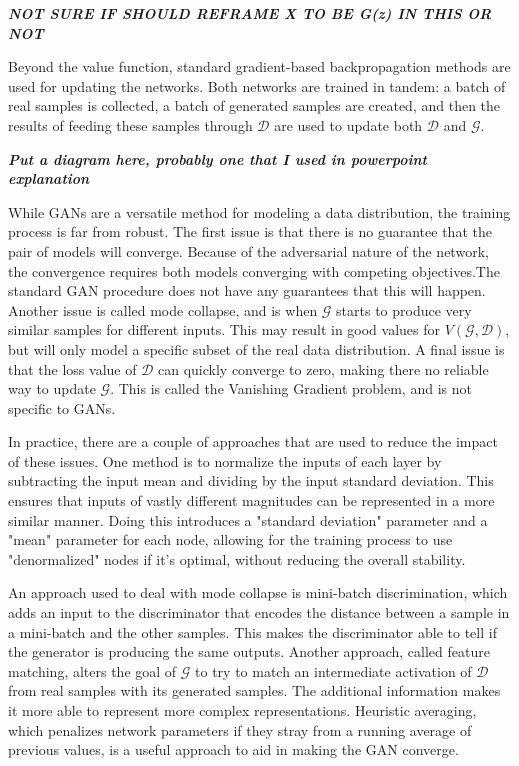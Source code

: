 	\textit{\textbf{NOT SURE IF SHOULD REFRAME X TO BE G(z) IN THIS OR NOT}}
	\par Beyond the value function, standard gradient-based backpropagation methods are used for updating the networks. Both networks are trained in tandem: a batch of real samples is collected, a batch of generated samples are created, and then the results of feeding these samples through $\mathcal{D}$ are used to update both $\mathcal{D}$ and $\mathcal{G}$.  
	\par \textit{\textbf{Put a diagram here, probably one that I used in powerpoint explanation}}
	\par While GANs are a versatile method for modeling a data distribution, the training process is far from robust. The first issue is that there is no guarantee that the pair of models will converge. Because of the adversarial nature of the network, the convergence requires both models converging with competing objectives.The standard GAN procedure does not have any guarantees that this will happen. Another issue is called mode collapse, and is when $\mathcal{G}$ starts to produce very similar samples for different inputs. This may result in good values for $V(\mathcal{G},\mathcal{D})$, but will only model a specific subset of the real data distribution. A final issue is that the loss value of $\mathcal{D}$ can quickly converge to zero, making there no reliable way to update $\mathcal{G}$. This is called the Vanishing Gradient problem, and is not specific to GANs. 
	\par In practice, there are a couple of approaches that are used to reduce the impact of these issues. One method is to normalize the inputs of each layer by subtracting the input mean and dividing by the input standard deviation. This ensures that inputs of vastly different magnitudes can be represented in a more similar manner. Doing this introduces a "standard deviation" parameter and a "mean" parameter for each node, allowing for the training process to use "denormalized" nodes if it's optimal, without reducing the overall stability.
	\par An approach used to deal with mode collapse is mini-batch discrimination, which adds an input to the discriminator that encodes the distance between a sample in a mini-batch and the other samples. This makes the discriminator able to tell if the generator is producing the same outputs. Another approach, called feature matching, alters the goal of $\mathcal{G}$ to try to match an intermediate activation of $\mathcal{D}$ from real samples with its generated samples. The additional information makes it more able to represent more complex representations. Heuristic averaging, which penalizes network parameters if they stray from a running average of previous values, is a useful approach to aid in making the GAN converge. 
